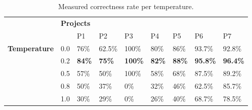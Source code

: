 \begin{table}
	\centering
	\caption{Measured correctness rate per temperature.}
	\label{table:correctnesspertemp}
	\resizebox{0.9\textwidth}{!} {
		\begin{tabular}{lllllllll}
			\toprule
			\centering
			& \multicolumn{6}{l}{\hspace{10.5em}\bfseries Projects}                                \\ %
			\multirow{3}{*}{\begin{turn}{-90}\bfseries Temperature\end{turn}} & \multicolumn{1}{l|}{}  & \multicolumn{1}{l|}{P1}       & \multicolumn{1}{l|}{P2}      &\multicolumn{1}{l|}{P3} & \multicolumn{1}{l|}{P4}   & \multicolumn{1}{l|}{P5}  & \multicolumn{1}{l|}{P6} & P7 \\ \cmidrule{2-9}
			
			& \multicolumn{1}{l|}{0.0} & \multicolumn{1}{l|}{76\%} & \multicolumn{1}{l|}{62.5\%}& \multicolumn{1}{l|}{100\%}& \multicolumn{1}{l|}{80\%}&\multicolumn{1}{l|}{86\%}&\multicolumn{1}{l|}{93.7\%}& 92.8\% \\ \cmidrule{2-9} 
			
			& \multicolumn{1}{l|}{0.2} & \multicolumn{1}{l|}{\cellcolor{green!35}\textbf{84\%}}& \multicolumn{1}{l|}{\cellcolor{green!35}\textbf{75\%}}& \multicolumn{1}{l|}{\cellcolor{green!35}\textbf{100\%}}& \multicolumn{1}{l|}{\cellcolor{green!35}\textbf{82\%}} &\multicolumn{1}{l|}{\cellcolor{green!35}\textbf{88\%}} &\multicolumn{1}{l|}{\cellcolor{green!35}\textbf{95.8\%}} & \cellcolor{green!35}\textbf{96.4\%} \\ \cmidrule{2-9} 
			
			& \multicolumn{1}{l|}{0.5} & \multicolumn{1}{l|}{57\%}& \multicolumn{1}{l|}{50\%}& \multicolumn{1}{l|}{100\%}& \multicolumn{1}{l|}{58\%} &\multicolumn{1}{l|}{68\%} &\multicolumn{1}{l|}{87.5\%} & 89.2\% \\ \cmidrule{2-9} 
			
			& \multicolumn{1}{l|}{0.8} & \multicolumn{1}{l|}{50\%}& \multicolumn{1}{l|}{37\%}& \multicolumn{1}{l|}{0\%}& \multicolumn{1}{l|}{32\%} &\multicolumn{1}{l|}{46\%} &\multicolumn{1}{l|}{62.5\%} & 85.7\% \\ \cmidrule{2-9} 
			
			& \multicolumn{1}{l|}{1.0} & \multicolumn{1}{l|}{30\%}& \multicolumn{1}{l|}{29\%}& \multicolumn{1}{l|}{0\%}& \multicolumn{1}{l|}{26\%} &\multicolumn{1}{l|}{40\%} &\multicolumn{1}{l|}{68.7\%} & 78.5\% \\ \bottomrule%
		\end{tabular}
	}
\end{table}


